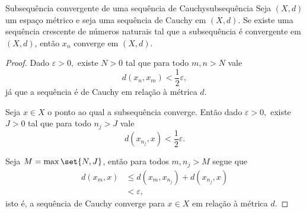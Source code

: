 \begin{lemma}{Subsequência convergente de uma sequência de Cauchy}{subsequência}
    Seja \((X,d)\) um espaço métrico e seja  uma sequência de Cauchy em \((X,d)\). Se existe uma sequência crescente  de números naturais tal que a subsequência  é convergente em \((X,d)\), então \(x_n\) converge em \((X,d)\).
\end{lemma}
\begin{proof}
    Dado \(\varepsilon > 0,\) existe \(N > 0\) tal que para todo \(m,n > N\) vale
    \begin{equation*}
        d(x_n, x_m) < \frac12 \varepsilon,
    \end{equation*}
    já que a sequência é de Cauchy em relação à métrica \(d\).

    Seja \(x \in X\) o ponto ao qual a subsequência converge. Então dado \(\varepsilon > 0,\) existe \(J > 0\) tal que para todo \(n_j > J\) vale
    \begin{equation*}
        d(x_{n_j}, x) < \frac12 \varepsilon.
    \end{equation*}

    Seja \(M = \max\set{N,J}\), então para todos \(m, n_j > M\) segue que
    \begin{align*}
        d(x_m, x) &\leq d(x_m, x_{n_j}) + d(x_{n_j}, x)\\
                  &< \varepsilon,
    \end{align*}
    isto é, a sequência de Cauchy converge para \(x \in X\) em relação à métrica \(d\).
\end{proof}

